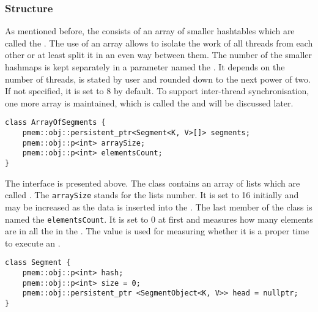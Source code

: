     \subsubsection{Structure} %

        As mentioned before, the \NvmHashMap consists of an array of smaller hashtables which are called the \ArrayOfSegments. 
        The use of an array allows to isolate the work of all threads from each other or at least split it in an even way between them. 
        The number of the smaller hashmaps is kept separately in a parameter named the \internalMapsCount. 
        It depends on the number of threads, is stated by user and rounded down to the next power of two.
        If not specified, it is set to 8 by default. 
        To support inter-thread synchronisation, one more array is maintained, which is called the \ArrayOfMutex and will be discussed later.
        
\begin{lstlisting}[caption={\ArrayOfSegments interface}]
class ArrayOfSegments {
    pmem::obj::persistent_ptr<Segment<K, V>[]> segments;
    pmem::obj::p<int> arraySize;
    pmem::obj::p<int> elementsCount;
}
\end{lstlisting}

        The \ArrayOfSegments interface is presented above. 
        The class contains an array of lists which are called \Segments. 
        The \texttt{arraySize} stands for the lists number. It is set to 16 initially and may be increased as the data is inserted into the \NvmHashMap. The last member of the class is named the \texttt{elementsCount}. It is set to 0 at first and measures how many elements are in all the \Segments in the \ArrayOfSegments. The value is used for measuring whether it is a proper time to execute an \expandMethod.
        
\begin{lstlisting}[caption={\ArrayOfSegments interface}]
class Segment {
    pmem::obj::p<int> hash;
    pmem::obj::p<int> size = 0;
    pmem::obj::persistent_ptr <SegmentObject<K, V>> head = nullptr;
}
\end{lstlisting}

